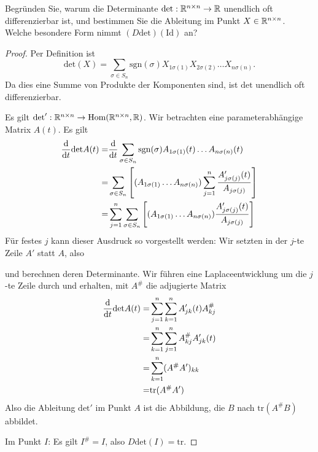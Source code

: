 \begin{Problem}
	Begründen Sie, warum die Determinante $\text{det}:\mathbb{R}^{n\times n}\to \mathbb{R}$ unendlich oft differenzierbar ist, und bestimmen Sie die Ableitung im Punkt $X\in \mathbb{R}^{n\times n}$. Welche besondere Form nimmt $(D\text{det})(\text{Id})$ an?  	
\end{Problem}
\begin{proof}
	Per Definition ist
	\[
		\text{det}(X)=\sum_{\sigma\in S_n} \text{sgn}(\sigma)X_{1\sigma(1)}X_{2\sigma(2)}\dots X_{n\sigma(n)}
	.\] 
	Da dies eine Summe von Produkte der Komponenten sind, ist $\text{det}$ unendlich oft differenzierbar.

	Es gilt $\text{det}':\mathbb{R}^{n\times n}\to\text{Hom}(\mathbb{R}^{n\times n},\mathbb{R})$. Wir betrachten eine parameterabhängige Matrix $A(t)$. Es gilt
	\begin{align*}
	\dv{t}\text{det}A(t)=&\dv{t}\sum_{\sigma\in S_n}\text{sgn}(\sigma)A_{1\sigma(1)}(t)\dots A_{n\sigma(n)}(t)\\
		=&\sum_{\sigma\in S_n}\left[ (A_{1\sigma(1)}\dots A_{n\sigma(n)}) \sum_{j=1}^n\frac{A_{j\sigma(j)}'(t)}{A_{j\sigma(j)}} \right] \\
				=&\sum_{j=1}^n\sum_{\sigma\in S_n}\left[ (A_{1\sigma(1)}\dots A_{n\sigma(n)}) \frac{A_{j\sigma(j)}'(t)}{A_{j\sigma(j)}} \right] 
	\end{align*}
	F\"{u}r festes $j$ kann dieser Ausdruck so vorgestellt werden: Wir setzten in der $j$-te Zeile $A'$ statt $A$, also 
			\begin{center}
	\end{center}
	und berechnen deren Determinante. Wir führen eine Laplaceentwicklung um die $j$-te Zeile durch und erhalten, mit $A^\#$ die adjugierte Matrix
	\begin{align*}
		\dv{t}\text{det} A(t)=&\sum_{j=1}^n\sum_{k=1}^n A_{jk}'(t)A^{\#}_{kj}\\
		=&\sum_{k=1}^n\sum_{j=1}^n A^{\#}_{kj}A_{jk}'(t)\\
		=&\sum_{k=1}^n (A^{\#} A')_{kk}\\
		=&\text{tr}(A^{\#}A')
	\end{align*}
	Also die Ableitung $\text{det}'$ im Punkt $A$ ist die Abbildung, die $B$ nach $\text{tr}(A^{\#}B)$ abbildet. 

	Im Punkt $I$: Es gilt $I^\#=I$, also $D\text{det}(I)=\text{tr}$.
\end{proof}
